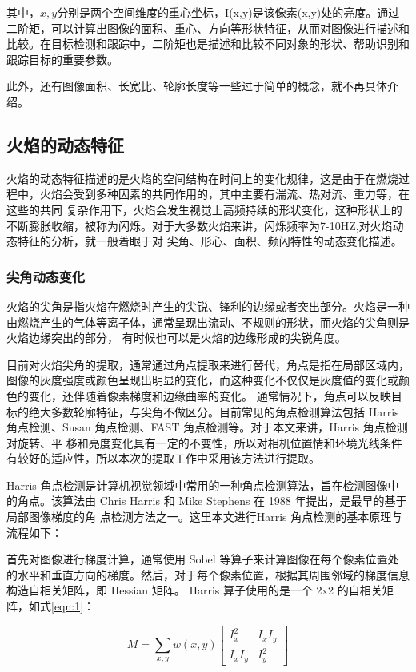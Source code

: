 其中，$\overline{x},\overline{y}$分别是两个空间维度的重心坐标，I(x,y)是该像素(x,y)处的亮度。通过二阶矩，可以计算出图像的面积、重心、方向等形状特征，从而对图像进行描述和比较。在目标检测和跟踪中，二阶矩也是描述和比较不同对象的形状、帮助识别和跟踪目标的重要参数。

此外，还有图像面积、长宽比、轮廓长度等一些过于简单的概念，就不再具体介绍。

\subsection{火焰的动态特征}
火焰的动态特征描述的是火焰的空间结构在时间上的变化规律，这是由于在燃烧过程中，火焰会受到多种因素的共同作用的，其中主要有湍流、热对流、重力等，在这些的共同
复杂作用下，火焰会发生视觉上高频持续的形状变化，这种形状上的不断膨胀收缩，被称为闪烁。对于大多数火焰来讲，闪烁频率为7-10HZ,对火焰动态特征的分析，就一般着眼于对
尖角、形心、面积、频闪特性的动态变化描述。
\subsubsection{尖角动态变化}
火焰的尖角是指火焰在燃烧时产生的尖锐、锋利的边缘或者突出部分。火焰是一种由燃烧产生的气体等离子体，通常呈现出流动、不规则的形状，而火焰的尖角则是火焰边缘突出的部分，
有时候也可以是火焰的边缘形成的尖锐角度。

目前对火焰尖角的提取，通常通过角点提取来进行替代，角点是指在局部区域内，图像的灰度强度或颜色呈现出明显的变化，而这种变化不仅仅是灰度值的变化或颜色的变化，还伴随着像素梯度和边缘曲率的变化。
通常情况下，角点可以反映目标的绝大多数轮廓特征，与尖角不做区分。目前常见的角点检测算法包括 Harris 角点检测、Susan 角点检测、FAST 角点检测等。对于本文来讲，Harris 角点检测对旋转、平
移和亮度变化具有一定的不变性，所以对相机位置情和环境光线条件有较好的适应性，所以本次的提取工作中采用该方法进行提取。

Harris 角点检测是计算机视觉领域中常用的一种角点检测算法，旨在检测图像中的角点。该算法由 Chris Harris 和 Mike Stephens 在 1988 年提出\cite{harris1988combined}，是最早的基于局部图像梯度的角
点检测方法之一。这里本文进行Harris 角点检测的基本原理与流程如下：

首先对图像进行梯度计算，通常使用 Sobel 等算子来计算图像在每个像素位置处的水平和垂直方向的梯度。然后，对于每个像素位置，根据其周围邻域的梯度信息构造自相关矩阵，即 Hessian 矩阵。
Harris 算子使用的是一个 2x2 的自相关矩阵，如式\ref{eqn:1}：

\begin{equation} \label{eqn:1}
    M = \sum_{x, y} w(x, y)
    \begin{bmatrix}
        I_x ^2&I_xI_y\\I_xI_y&I_y ^2
    \end{bmatrix}
\end{equation}


